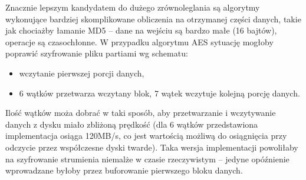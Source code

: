 \documentclass[a4paper,12pt]{article}
\begin{document}
Znacznie lepszym kandydatem do dużego zrównoleglania są algorytmy wykonujące bardziej
skomplikowane obliczenia na otrzymanej części danych, takie jak chociażby łamanie 
MD5 -- dane na wejściu są bardzo małe (16 bajtów), operacje są czasochłonne. W przypadku 
algorytmu AES sytuację mogłoby poprawić szyfrowanie pliku partiami wg schematu:
\begin{itemize}
\item wczytanie pierwszej porcji danych,
\item 6 wątków przetwarza wczytany blok, 7 wątek wczytuje kolejną porcję danych.
\end{itemize}
Ilość wątków moża dobrać w taki sposób, aby przetwarzanie i wczytywanie danych z dysku
miało zbliżoną prędkość (dla 6 wątków przedstawiona implementacja osiąga 120MB/s, co 
jest wartością możliwą do osiągnięcia przy odczycie przez współczesne dyski twarde).
Taka wersja implementacji powoliłaby na szyfrowanie strumienia niemalże w czasie
rzeczywistym -- jedyne opóźnienie wprowadzane byłoby przez buforowanie pierwszego bloku danych.
\end{document}
